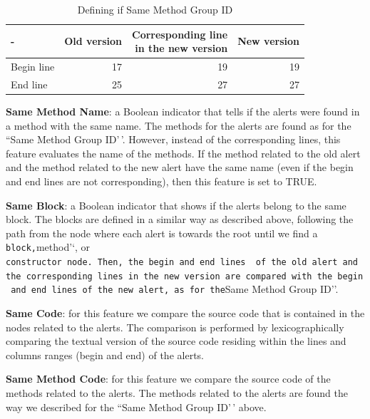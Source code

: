 \documentclass[
]{article}
\begin{document}
\normalsize

\small

\begin{table}[H]

\caption{\label{tab:unnamed-chunk-11}Defining if Same Method Group ID \label{tab_same_method_2}}
\centering
\begin{tabular}[t]{l|r|r|r}
\hline
- & Old version & \makecell[l]{Corresponding line\\in the new version} & New version\\
\hline
Begin line & 17 & 19 & 19\\
\hline
End line & 25 & 27 & 27\\
\hline
\end{tabular}
\end{table}

\normalsize

\noindent \textbf{Same Method Name}: a Boolean indicator that tells if
the alerts were found in a method with the same name. The methods for
the alerts are found as for the ``Same Method Group ID'\,'. However,
instead of the corresponding lines, this feature evaluates the name of
the methods. If the method related to the old alert and the method
related to the new alert have the same name (even if the begin and end
lines are not corresponding), then this feature is set to TRUE.

\noindent \textbf{Same Block}: a Boolean indicator that shows if the
alerts belong to the same block. The blocks are defined in a similar way
as described above, following the path from the node where each alert is
towards the root until we find a
\texttt{block\textquotesingle{}\textquotesingle{},}method'`, or
\texttt{constructor\textquotesingle{}\textquotesingle{}\ node.\ Then,\ the\ begin\ and\ end\ lines\ \ of\ the\ old\ alert\ and\ the\ corresponding\ lines\ in\ the\ new\ version\ are\ compared\ with\ the\ begin\ and\ end\ lines\ of\ the\ new\ alert,\ as\ for\ the}Same
Method Group ID''.

\noindent \textbf{Same Code}: for this feature we compare the source
code that is contained in the nodes related to the alerts. The
comparison is performed by lexicographically comparing the textual
version of the source code residing within the lines and columns ranges
(begin and end) of the alerts.

\noindent \textbf{Same Method Code}: for this feature we compare the
source code of the methods related to the alerts. The methods related to
the alerts are found the way we described for the ``Same Method Group
ID'\,' above.
\end{document}
